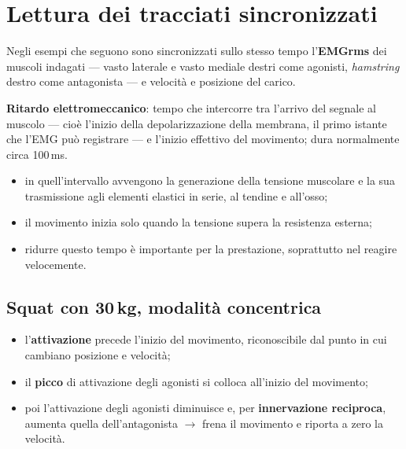 \section{Lettura dei tracciati sincronizzati}

Negli esempi che seguono sono sincronizzati sullo stesso tempo l'\textbf{EMGrms} dei muscoli
indagati --- vasto laterale e vasto mediale destri come agonisti, \textit{hamstring} destro come
antagonista --- e velocità e posizione del carico.

\textbf{Ritardo elettromeccanico}: tempo che intercorre tra l'arrivo del segnale al muscolo --- cioè
l'inizio della depolarizzazione della membrana, il primo istante che l'EMG può registrare --- e
l'inizio effettivo del movimento; dura normalmente circa 100\,ms.
\begin{itemize}
  \item in quell'intervallo avvengono la generazione della tensione muscolare e la sua trasmissione
    agli elementi elastici in serie, al tendine e all'osso;
  \item il movimento inizia solo quando la tensione supera la resistenza esterna;
  \item ridurre questo tempo è importante per la prestazione, soprattutto nel reagire velocemente.
\end{itemize}

\subsection{Squat con 30\,kg, modalità concentrica}
\begin{itemize}
  \item l'\textbf{attivazione} precede l'inizio del movimento, riconoscibile dal punto in cui
    cambiano posizione e velocità;
  \item il \textbf{picco} di attivazione degli agonisti si colloca all'inizio del movimento;
  \item poi l'attivazione degli agonisti diminuisce e, per \textbf{innervazione reciproca}, aumenta
    quella dell'antagonista $\rightarrow$ frena il movimento e riporta a zero la velocità.
\end{itemize}

